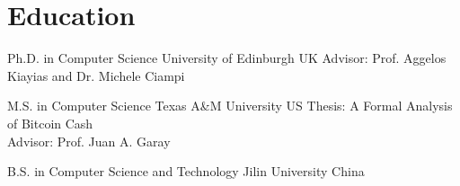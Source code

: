 \section{Education}

{Ph.D. in Computer Science}
{University of Edinburgh}
{UK}
{}
{Advisor: Prof. Aggelos Kiayias and Dr. Michele Ciampi}

{M.S. in Computer Science}
{Texas A\&M University}
{}
{US}
{Thesis: A Formal Analysis of Bitcoin Cash \\Advisor: Prof. Juan A. Garay}

{B.S. in Computer Science and Technology}
{Jilin University}
{}
{China}
{}

